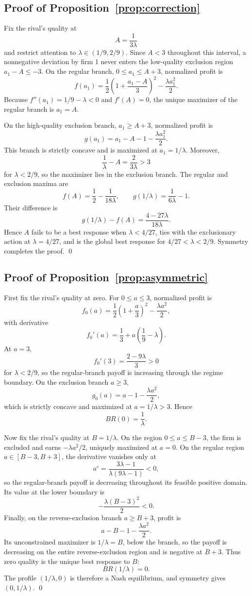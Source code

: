 \subsection{Proof of Proposition~\ref{prop:correction}}\label{app:correction-proof}

Fix the rival's quality at
\[
 A=\frac1{3\lambda}
\]
and restrict attention to $\lambda\in(1/9,2/9)$. Since $A<3$ throughout this interval, a nonnegative deviation by firm 1 never enters the low-quality exclusion region $a_1-A\leq-3$. On the regular branch, $0\leq a_1\leq A+3$, normalized profit is
\[
 f(a_1)=\frac12\left(1+\frac{a_1-A}{3}\right)^2-\frac{\lambda a_1^2}{2}.
\]
Because $f''(a_1)=1/9-\lambda<0$ and $f'(A)=0$, the unique maximizer of the regular branch is $a_1=A$.

On the high-quality exclusion branch, $a_1\geq A+3$, normalized profit is
\[
 g(a_1)=a_1-A-1-\frac{\lambda a_1^2}{2}.
\]
This branch is strictly concave and is maximized at $a_1=1/\lambda$. Moreover,
\[
 \frac1\lambda-A=\frac{2}{3\lambda}>3
\]
for $\lambda<2/9$, so the maximizer lies in the exclusion branch. The regular and exclusion maxima are
\[
 f(A)=\frac12-\frac1{18\lambda},
 \qquad
 g(1/\lambda)=\frac1{6\lambda}-1.
\]
Their difference is
\[
 g(1/\lambda)-f(A)=\frac{4-27\lambda}{18\lambda}.
\]
Hence $A$ fails to be a best response when $\lambda<4/27$, ties with the exclusionary action at $\lambda=4/27$, and is the global best response for $4/27<\lambda<2/9$. Symmetry completes the proof. \qed

\subsection{Proof of Proposition~\ref{prop:asymmetric}}\label{app:asymmetric-proof}

First fix the rival's quality at zero. For $0\leq a\leq3$, normalized profit is
\[
 f_0(a)=\frac12\left(1+\frac a3\right)^2-\frac{\lambda a^2}{2},
\]
with derivative
\[
 f_0'(a)=\frac13+a\left(\frac19-\lambda\right).
\]
At $a=3$,
\[
 f_0'(3)=\frac{2-9\lambda}{3}>0
\]
for $\lambda<2/9$, so the regular-branch payoff is increasing through the regime boundary. On the exclusion branch $a\geq3$,
\[
 g_0(a)=a-1-\frac{\lambda a^2}{2},
\]
which is strictly concave and maximized at $a=1/\lambda>3$. Hence
\[
 BR(0)=\frac1\lambda.
\]

Now fix the rival's quality at $B=1/\lambda$. On the region $0\leq a\leq B-3$, the firm is excluded and earns $-\lambda a^2/2$, uniquely maximized at $a=0$. On the regular region $a\in[B-3,B+3]$, the derivative vanishes only at
\[
 a^{c}=\frac{3\lambda-1}{\lambda(9\lambda-1)}<0,
\]
so the regular-branch payoff is decreasing throughout its feasible positive domain. Its value at the lower boundary is
\[
 -\frac{\lambda(B-3)^2}{2}<0.
\]
Finally, on the reverse-exclusion branch $a\geq B+3$, profit is
\[
 a-B-1-\frac{\lambda a^2}{2}.
\]
Its unconstrained maximizer is $1/\lambda=B$, below the branch, so the payoff is decreasing on the entire reverse-exclusion region and is negative at $B+3$. Thus zero quality is the unique best response to $B$:
\[
 BR(1/\lambda)=0.
\]
The profile $(1/\lambda,0)$ is therefore a Nash equilibrium, and symmetry gives $(0,1/\lambda)$. \qed
